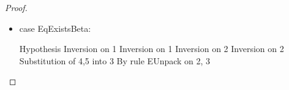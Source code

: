 \begin{proof}
\begin{itemize}
  \begin{eqnproof}
              {Hypothesis}
              {Inversion on 1}
              {Inversion on 1}
  \end{eqnproof}

  \begin{eqnproof}
          {Induction}[1em]

          {Semantics}
          {Strengthening}[1em]

          {Semantics}
          {Strengthening}[1em]

          {Transitivity}[1em]

          {Extensionality}[1em]
  \end{eqnproof}

\item case EqExistsBeta: 

  \begin{eqnproof}
              {Hypothesis}
              {Inversion on 1}
              {Inversion on 1}
    \eclaim[4]{\judgeWK{\tau}{\kappa}}
              {Inversion on 2}
              {Inversion on 2}
              {Substitution of 4,5 into 3}
              {By rule EUnpack on 2, 3}
  \end{eqnproof}


\end{itemize}
\end{proof}
